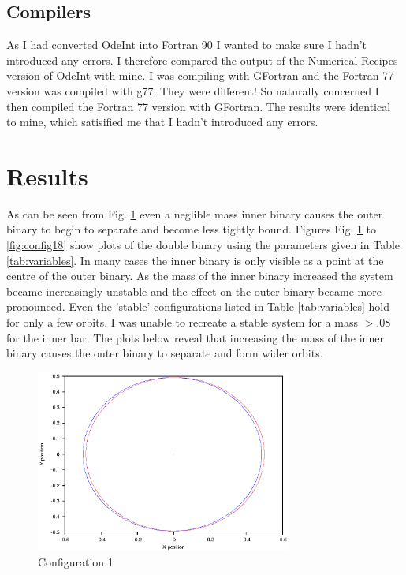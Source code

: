 \documentclass[a4paper,12pt]{article}
\begin{document}
\subsection{Compilers}
As I had converted OdeInt into Fortran 90 I wanted to make sure I hadn't introduced any errors. I therefore compared the output of the Numerical Recipes
version of OdeInt with mine. I was compiling with GFortran and the Fortran 77 version was compiled with g77. They were different! So naturally concerned 
I then compiled the Fortran 77 version with GFortran. The results were identical to mine, which satisified me that I hadn't introduced any errors.

\section{Results}
As can be seen from Fig. \ref{fig:config1} even a neglible mass inner binary causes the outer binary to begin to separate and become less tightly bound.
Figures Fig. \ref{fig:config1} to \ref{fig:config18} show plots of the double binary using the parameters given in Table \ref{tab:variables}.
In many cases the inner binary is only visible as a point at the centre of the outer binary.
As the mass of the inner binary increased the system became increasingly unstable and the effect on the outer binary became more pronounced.
Even the 'stable' configurations listed in Table \ref{tab:variables} hold for only a few orbits.
I was unable to recreate a stable system for a mass $>.08$ for the inner bar.
The plots below reveal that increasing the mass of the inner binary causes the outer binary to separate and
form wider orbits.
\begin{figure}[H]
\centering
\includegraphics[width=0.75\textwidth]{./results/stablebase/Orbit.eps}
\caption{Configuration 1}
\label{fig:config1}
\end{figure}
\end{document}
